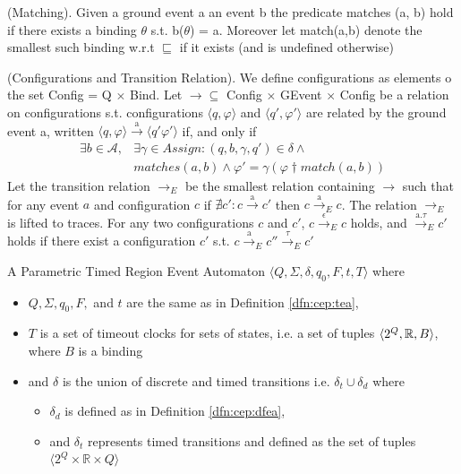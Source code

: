 			\begin{dfn}
				(Matching).
				Given a ground event a an event b the predicate matches (a, b) hold if there exists a binding $\theta$ s.t. b($\theta$) = a.
				Moreover let match(a,b) denote the smallest such binding w.r.t $\sqsubseteq$ if it exists (and is undefined otherwise)
			\end{dfn}
			
			\begin{dfn}
				(Configurations and Transition Relation).
				We define configurations as elements o the set Config = Q $\times$ Bind. Let $\rightarrow \subseteq$ Config $\times$ GEvent $\times$ Config be a relation on
				configurations s.t. configurations $\langle q, \varphi \rangle$ and $\langle q', \varphi' \rangle$ are related by the ground event a, written
				$\langle q, \varphi \rangle \xrightarrow{\text{a}} \langle q' \varphi' \rangle$ if, and only if
					\begin{align}
						\exists b \in \mathcal{A}, & \exists \gamma \in Assign : (q, b, \gamma, q') \in \delta \wedge \\
						&matches(a,b) \wedge \varphi' = \gamma(\varphi \dagger match(a,b))
					\end{align}
				Let the transition relation $\rightarrow_{E}$ be the smallest relation containing $\rightarrow$ such that for any event
				$a$ and configuration $c$ if $\nexists c' : c \xrightarrow{\text{a}} c'$ then $ c \xrightarrow{\text{a}}_E c$.
				The relation $\rightarrow_E$ is lifted to traces.
				For any two configurations $c$ and $c'$, $ c \xrightarrow{\text{$\epsilon$}}_E c$ holds, and $\xrightarrow{\text{a.$\tau$}}_E c'$ holds
				if there exist a configuration $c'$ s.t. $c \xrightarrow{\text{a}}_E c'' \xrightarrow{\text{$\tau$}}_E c'$
			\end{dfn}
			
			
			\begin{dfn}
				\label{dfn:cep:PTREA}
				A Parametric Timed Region Event Automaton $\langle Q,\Sigma,\delta,q_0, F, t, T \rangle$ where
				\begin{itemize}
					\item $Q, \Sigma, q_0, F,$ and  $t$ are the same as in Definition \ref{dfn:cep:tea},
					\item $T$ is a set of timeout clocks for sets of states, i.e. a set of tuples $\langle 2^Q, \mathbb{R}, B \rangle$, where $B$ is a binding
					\item and $\delta$ is the union of discrete and timed transitions i.e. $\delta_t \cup \delta_d$ where
					\begin{itemize}
						\item $\delta_d$ is defined as in Definition \ref{dfn:cep:dfea},
						\item and $\delta_t$ represents timed transitions and defined as the set of tuples $\langle 2^Q \times \mathbb{R} \times Q \rangle$ 
					\end{itemize}
				\end{itemize}
			\end{dfn}

